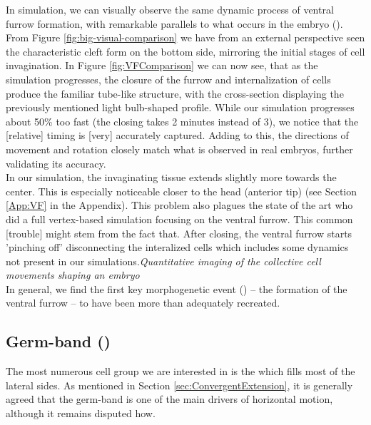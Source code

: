 In simulation, we can visually observe the same dynamic process of ventral furrow formation, with remarkable parallels to what occurs in the embryo (). From Figure \ref{fig:big-visual-comparison} we have from an external perspective seen the characteristic cleft form on the bottom side, mirroring the initial stages of cell invagination. In Figure \ref{fig:VFComparison} we can now see, that as the simulation progresses, the closure of the furrow and internalization of cells produce the familiar tube-like structure, with the cross-section displaying the previously mentioned light bulb-shaped profile. While our simulation progresses about 50\% too fast (the closing takes 2 minutes instead of 3), we notice that the [relative] timing is [very] accurately captured. Adding to this, the directions of movement and rotation closely match what is observed in real embryos, further validating its accuracy. \\

In our simulation, the invaginating tissue extends slightly more towards the center. This is especially noticeable closer to the head (anterior tip) (see Section \ref{App:VF} in the Appendix). This problem also plagues the state of the art  who did a full vertex-based simulation focusing on the ventral furrow. This common [trouble] might stem from the fact that. After closing, the ventral furrow starts 'pinching off' disconnecting the interalized cells which includes some dynamics not present in our simulations.\textit{Quantitative imaging of the collective cell movements shaping an embryo} \\
In general, we find the first key morphogenetic event () -- the formation of the ventral furrow --  to have been more than adequately recreated.

\subsection{Germ-band ()}
The most numerous cell group we are interested in is the  which fills most of the lateral sides. As mentioned in Section \ref{sec:ConvergentExtension}, it is generally agreed that the germ-band is one of the main drivers of horizontal motion, although it remains disputed how.


